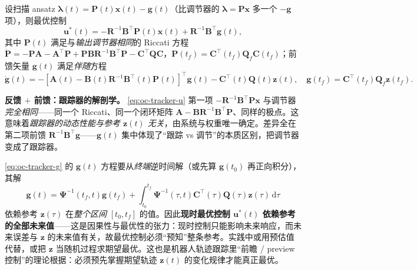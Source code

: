 \begin{theorem}[跟踪器最优控制]\label{thm:oc-tracker}
设扫描 ansatz $\boldsymbol\lambda(t)=\mathbf P(t)\mathbf x(t)-\mathbf g(t)$（比调节器的 $\boldsymbol\lambda=\mathbf P\mathbf x$ 多一个 $-\mathbf g$ 项），则最优控制
\begin{equation}
  \boxed{\mathbf u^*(t)=-\mathbf R^{-1}\mathbf B^\top\mathbf P(t)\mathbf x(t)+\mathbf R^{-1}\mathbf B^\top\mathbf g(t),}
  \label{eq:oc-tracker-u}
\end{equation}
其中 $\mathbf P(t)$ 满足与\emph{输出调节器相同}的 Riccati 方程 $\dot{\mathbf P}=-\mathbf P\mathbf A-\mathbf A^\top\mathbf P+\mathbf P\mathbf B\mathbf R^{-1}\mathbf B^\top\mathbf P-\mathbf C^\top\mathbf Q\mathbf C$，$\mathbf P(t_f)=\mathbf C^\top(t_f)\mathbf Q_f\mathbf C(t_f)$；前馈矢量 $\mathbf g(t)$ 满足\emph{伴随}方程
\begin{equation}
  \dot{\mathbf g}(t)=-[\mathbf A(t)-\mathbf B(t)\mathbf R^{-1}\mathbf B^\top(t)\mathbf P(t)]^\top\mathbf g(t)-\mathbf C^\top(t)\mathbf Q(t)\mathbf z(t),\quad\mathbf g(t_f)=\mathbf C^\top(t_f)\mathbf Q_f\mathbf z(t_f).
  \label{eq:oc-tracker-g}
\end{equation}
\end{theorem}

\begin{insight}
\textbf{反馈 $+$ 前馈：跟踪器的解剖学。}\; \cref{eq:oc-tracker-u} 第一项 $-\mathbf R^{-1}\mathbf B^\top\mathbf P\mathbf x$ 与调节器\emph{完全相同}——同一个 Riccati、同一个闭环矩阵 $\mathbf A-\mathbf B\mathbf R^{-1}\mathbf B^\top\mathbf P$、同样的极点。这意味着\emph{跟踪器的动态性能与参考 $\mathbf z(t)$ 无关}，由系统与权重唯一确定。差异全在第二项前馈 $\mathbf R^{-1}\mathbf B^\top\mathbf g$——$\mathbf g(t)$ 集中体现了“跟踪 vs 调节”的本质区别，把调节器变成了跟踪器。
\end{insight}

\begin{pitfall}
\cref{eq:oc-tracker-g} 的 $\mathbf g(t)$ 方程要从\emph{终端}逆时间解（或先算 $\mathbf g(t_0)$ 再正向积分），其解
\[
  \mathbf g(t)=\boldsymbol\Psi^{-1}(t_f,t)\mathbf g(t_f)+\int_{t_0}^{t_f}\boldsymbol\Psi^{-1}(\tau,t)\mathbf C^\top(\tau)\mathbf Q(\tau)\mathbf z(\tau)\,\mathrm d\tau
\]
依赖参考 $\mathbf z(\tau)$ 在\emph{整个区间} $[t_0,t_f]$ 的值。因此\textbf{现时最优控制 $\mathbf u^*(t)$ 依赖参考的全部未来值}——这是因果性与最优性的张力：现时控制只能影响未来响应，而未来误差与 $\mathbf z$ 的未来值有关，故最优控制必须“预知”整条参考。实践中或用预估值代替，或把 $\mathbf z$ 当随机过程求期望最优。这也是机器人轨迹跟踪里“前瞻 / preview 控制”的理论根据：必须预先掌握期望轨迹 $\mathbf z(t)$ 的变化规律才能真正最优。
\end{pitfall}

